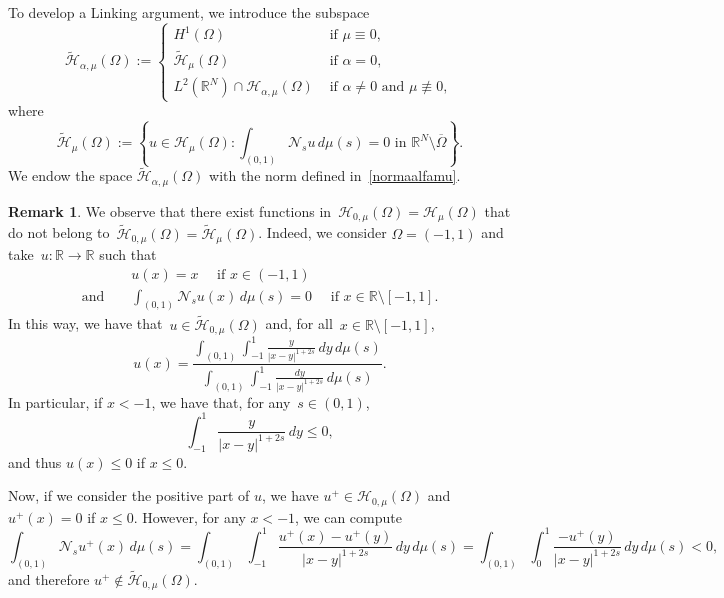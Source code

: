 \documentclass[12pt,a4paper,intlimits,sumlimits]{amsart}
\def \R {\mathbb{R}}
\def \Ns {\mathscr{N}_{s}}
\theoremstyle{definition}
\newtheorem{remark}[definition]{Remark}
\theoremstyle{plain}
\numberwithin{equation}{section}
\renewcommand{\leq}{\leqslant}
\begin{document}
To develop a Linking argument,  we introduce the subspace
\begin{equation}\label{tildeacca}
\widetilde{\mathcal H}_{\alpha, \mu}(\Omega):=\begin{cases}
H^1(\Omega) &\mbox{ if } \mu\equiv 0,\\
\widetilde{\mathcal H}_{\mu}(\Omega) &\mbox{ if } \alpha = 0,\\
 L^2(\R^N) \cap
\mathcal H_{\alpha, \mu}(\Omega)&\mbox{ if } \alpha\neq 0 \text{ and }\mu\not\equiv 0,
\end{cases}
\end{equation}
where
\begin{equation}\label{H0MU}
\widetilde{\mathcal H}_{\mu}(\Omega):=\left\{u\in\mathcal H_{\mu}(\Omega) : \int_{(0, 1)}\Ns u\, d\mu(s)=0
\mbox{ in }\R^N\setminus \overline{\Omega}\right\}.
\end{equation}
We endow the space $\widetilde{\mathcal H}_{\alpha, \mu}(\Omega)$ with the norm defined in~\eqref{normaalfamu}.
\begin{remark}
We observe that there exist functions
in~${\mathcal H}_{0, \mu}(\Omega)={\mathcal H}_{\mu}(\Omega)$ that do not belong to~$\widetilde{\mathcal H}_{0, \mu}(\Omega)
=\widetilde{\mathcal H}_{\mu}(\Omega)$.
Indeed, we consider $\Omega=(-1,1)$ and take~$u:\R\to \R$ such that
\begin{eqnarray*}
&&u(x)=x \quad \mbox{ if } x\in(-1,1)
\\
{\mbox{and }}&& 
\int_{(0, 1)}\Ns u(x)\, d\mu(s)=0\quad \mbox{ if } x\in\R\setminus[-1,1].
\end{eqnarray*}
In this way, we have that~$u\in \widetilde{\mathcal H}_{0, \mu}(\Omega)$ and, for all~$x\in\R\setminus[-1,1]$,
\[
u(x)=
\dfrac{\displaystyle \int_{(0,1)}\int_{-1}^1 \frac{y}{|x-y|^{1+2s}}\,dy\,d\mu(s)}{\displaystyle \int_{(0,1)}\int_{-1}^1 \frac{dy}{|x-y|^{1+2s}}\,d\mu(s)}.
\]
In particular, if $x<-1$, we have that, for any~$s\in(0,1)$,
\[
\int_{-1}^1 \frac{y}{|x-y|^{1+2s}}\,dy\leq 0 ,
\]
and thus $u(x)\leq 0$ if $x\leq 0$.

Now, if we consider the 
positive part of $u$, we have $u^+\in {\mathcal H}_{0, \mu}(\Omega)$ and $u^+(x)=0$ if $x\leq 0$. 
However, for any $x<-1$, we can compute
\begin{equation*}
\int_{(0, 1)}\Ns u^+(x)\, d\mu(s)=\int_{(0, 1)} \int_{-1}^1 \frac{u^+(x)-u^+(y)}{|x-y|^{1+2s}}\,dy\,d\mu(s)
=\int_{(0, 1)}\int_0^1 \frac{-u^+(y)}{|x-y|^{1+2s}}\,dy\,d\mu(s)
<0,
\end{equation*}
and therefore $u^+\not \in \widetilde{\mathcal H}_{0, \mu}(\Omega)$.
\end{remark}
\end{document}
